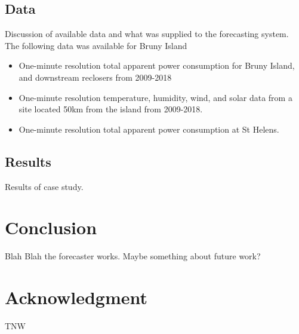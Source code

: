 \documentclass[conference]{IEEEtran}
\begin{document}
\subsection{Data}
Discussion of available data and what was supplied to the forecasting system.
The following data was available for Bruny Island
\begin{itemize}
	\item One-minute resolution total apparent power consumption for Bruny Island, and downstream reclosers from 2009-2018
	\item One-minute resolution temperature, humidity, wind, and solar data from a site located 50km from the island from 2009-2018. 
	\item One-minute resolution total apparent power consumption at  St Helens. 
\end{itemize}

\subsection{Results}
Results of case study.

\section{Conclusion}
Blah Blah the forecaster works.
Maybe something about future work?


\section*{Acknowledgment}
TNW




\end{document}
